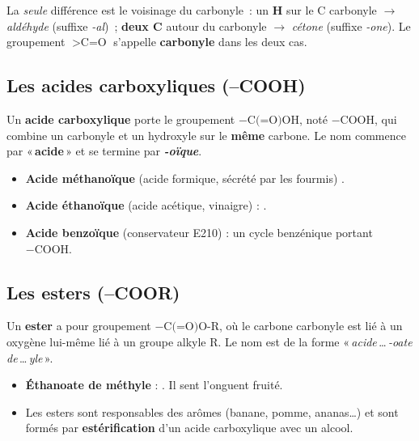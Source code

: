 \documentclass[11pt,a4paper]{article}
\begin{document}
\begin{attention}
La \emph{seule} différence est le voisinage du carbonyle~: un \textbf{H} sur le C carbonyle $\rightarrow$ \emph{aldéhyde} (suffixe \textit{-al})~; \textbf{deux C} autour du carbonyle $\rightarrow$ \emph{cétone} (suffixe \textit{-one}). Le groupement $>\text{C=O}$ s'appelle \textbf{carbonyle} dans les deux cas.
\end{attention}

\subsection{Les acides carboxyliques (--COOH)}
\begin{definition}
Un \textbf{acide carboxylique} porte le groupement $-\text{C(=O)OH}$, noté $-\text{COOH}$, qui combine un carbonyle et un hydroxyle sur le \textbf{même} carbone. Le nom commence par «\,\textbf{acide}\,» et se termine par \textbf{\textit{-oïque}}.
\end{definition}

\begin{exemple}
\begin{itemize}[leftmargin=1.6em,itemsep=2pt]
  \item \textbf{Acide méthanoïque} (acide formique, sécrété par les fourmis) .
  \item \textbf{Acide éthanoïque} (acide acétique, vinaigre)  : .
  \item \textbf{Acide benzoïque} (conservateur E210) : un cycle benzénique portant $-\text{COOH}$.
\end{itemize}
\end{exemple}

\subsection{Les esters (--COOR)}
\begin{definition}[Ester]
Un \textbf{ester} a pour groupement $-\text{C(=O)O-R}$, où le carbone carbonyle est lié à un oxygène lui-même lié à un groupe alkyle R. Le nom est de la forme «\,\textit{acide}\,\dots\,\textit{-oate de}\,\dots\,\textit{yle}\,».
\end{definition}

\begin{exemple}[Esters]
\begin{itemize}[leftmargin=1.6em,itemsep=2pt]
  \item \textbf{Éthanoate de méthyle}  : . Il sent l'onguent fruité.
  \item Les esters sont responsables des arômes (banane, pomme, ananas\dots) et sont formés par \textbf{estérification} d'un acide carboxylique avec un alcool.
\end{itemize}
\end{exemple}
\end{document}
